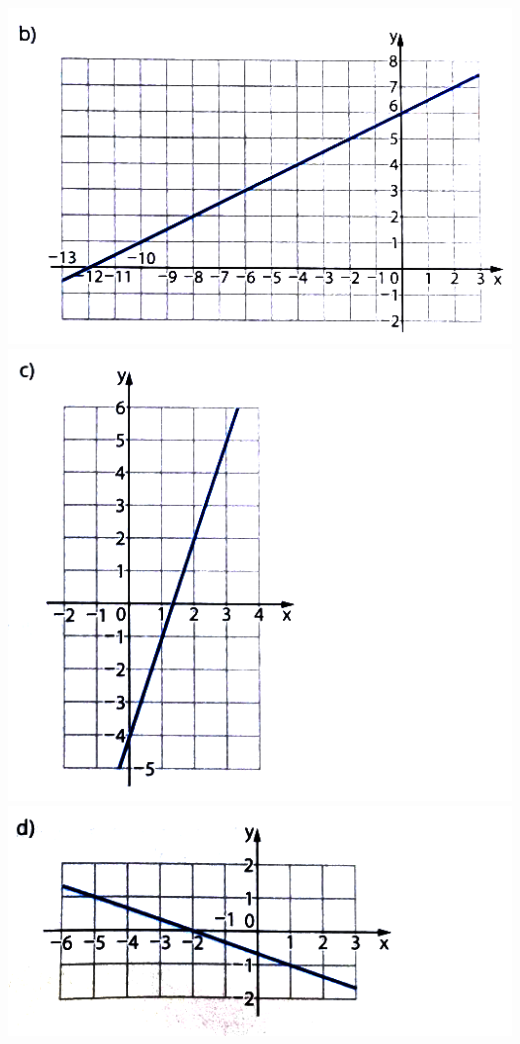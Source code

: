 \documentclass[a4paper,14pt]{article}
\begin{document}
\begin{multicols}{2}
\begin{enumerate}
        	\includegraphics[width=1\linewidth]{8FMA57_imagens/imagem3}
        	\includegraphics[width=1\linewidth]{8FMA57_imagens/imagem4}
        	\includegraphics[width=1\linewidth]{8FMA57_imagens/imagem5} \\\\\\\\\\

\end{enumerate}
\end{multicols}
\end{document}

